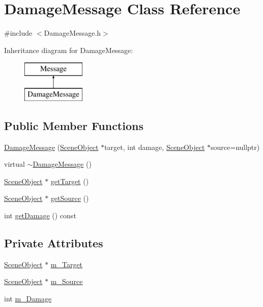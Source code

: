 \hypertarget{class_damage_message}{}\section{Damage\+Message Class Reference}
\label{class_damage_message}


{\ttfamily \#include $<$Damage\+Message.\+h$>$}

Inheritance diagram for Damage\+Message\+:\begin{figure}[H]
\begin{center}
\leavevmode
\includegraphics[height=2.000000cm]{class_damage_message}
\end{center}
\end{figure}
\subsection*{Public Member Functions}
\begin{DoxyCompactItemize}
\item 
\hyperlink{class_damage_message_a26d1bff48f200de36e3401133026c94a}{Damage\+Message} (\hyperlink{class_scene_object}{Scene\+Object} $\ast$target, int damage, \hyperlink{class_scene_object}{Scene\+Object} $\ast$source=nullptr)
\item 
virtual \hyperlink{class_damage_message_a0fffc9a2df40368c8ac11b34078d5067}{$\sim$\+Damage\+Message} ()
\item 
\hyperlink{class_scene_object}{Scene\+Object} $\ast$ \hyperlink{class_damage_message_a10fd1ad5f3ca88a6c0d75bfa7a65db8b}{get\+Target} ()
\item 
\hyperlink{class_scene_object}{Scene\+Object} $\ast$ \hyperlink{class_damage_message_a2bacfef6bb9a3862abf968a8fc704724}{get\+Source} ()
\item 
int \hyperlink{class_damage_message_a5d7f2a29ad64c0f8650866827f6281bf}{get\+Damage} () const 
\end{DoxyCompactItemize}
\subsection*{Private Attributes}
\begin{DoxyCompactItemize}
\item 
\hyperlink{class_scene_object}{Scene\+Object} $\ast$ \hyperlink{class_damage_message_aa0b42b74f7243b8636d4b4b467f76d8e}{m\+\_\+\+Target}
\item 
\hyperlink{class_scene_object}{Scene\+Object} $\ast$ \hyperlink{class_damage_message_a6b0e3e9316ba34f864e93fa73b8cba67}{m\+\_\+\+Source}
\item 
int \hyperlink{class_damage_message_a13210e9d91fcac17df553f1f3d029275}{m\+\_\+\+Damage}
\end{DoxyCompactItemize}


